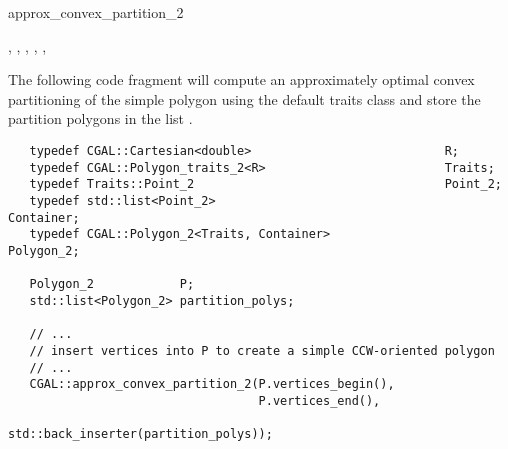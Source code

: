 \begin{ccRefFunction}{approx_convex_partition_2}
\ccSeeAlso

,
,
,
,
,

\ccExample

The following code fragment will compute an approximately optimal
convex partitioning of the simple polygon  using the default
traits class and store the partition polygons in the list 
.

\begin{verbatim}
   typedef CGAL::Cartesian<double>                           R;
   typedef CGAL::Polygon_traits_2<R>                         Traits;
   typedef Traits::Point_2                                   Point_2;
   typedef std::list<Point_2>                                Container;
   typedef CGAL::Polygon_2<Traits, Container>                Polygon_2;

   Polygon_2            P;
   std::list<Polygon_2> partition_polys;

   // ...
   // insert vertices into P to create a simple CCW-oriented polygon
   // ...
   CGAL::approx_convex_partition_2(P.vertices_begin(),
                                   P.vertices_end(),
                                   std::back_inserter(partition_polys));
\end{verbatim}

\end{ccRefFunction}
